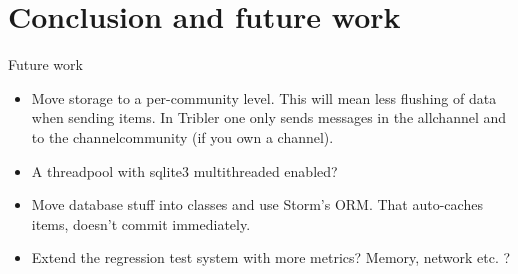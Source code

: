 \chapter{Conclusion and future work}


Future work

\begin{itemize}
	\item Move storage to a per-community level. This will mean less flushing of data when sending items. In Tribler one only sends messages in the allchannel and to the channelcommunity (if you own a channel).
	\item A threadpool with sqlite3 multithreaded enabled? 
	\item Move database stuff into classes and use Storm's ORM. That auto-caches items, doesn't commit immediately.
	\item Extend the regression test system with more metrics? Memory, network etc. ?
\end{itemize}